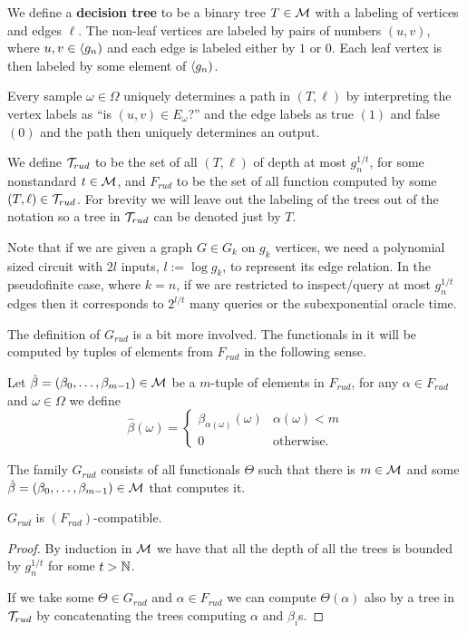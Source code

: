 \begin{defi}
We define a \textbf{decision tree} to be a binary tree $T\in\mathcal{M}$ with a labeling of vertices and edges $\ell$. The non-leaf vertices are labeled by pairs of numbers $(u,v)$, where $u,v\in\langle g_n)$ and each edge is labeled either by $1$ or $0$. Each leaf vertex is then labeled by some element of $\langle g_n)$.

Every sample $\omega\in\Omega$ uniquely determines a path in $(T,\ell)$ by interpreting the vertex labels as ``is $(u,v)\in E_\omega$?'' and the edge labels as true $(1)$ and false $(0)$ and the path then uniquely determines an output.

We define $\mathcal{T}_{rud}$ to be the set of all $(T,\ell)$ of depth at most $g_n^{1/t}$, for some nonstandard $t\in\mathcal{M}$, and $F_{rud}$ to be the set of all function computed by some $(T,\ell)\in \mathcal{T}_{rud}$. For brevity we will leave out the labeling of the trees out of the notation so a tree in $\mathcal{T}_{rud}$ can be denoted just by $T$.
\end{defi}

Note that if we are given a graph $G\in G_k$ on $g_k$ vertices, we need a polynomial sized circuit with $2l$ inputs, $l:=\log g_k$, to represent its edge relation. In the pseudofinite case, where $k=n$, if we are restricted to inspect/query at most $g_n^{1/t}$ edges then it corresponds to $2^{l/t}$ many queries or the subexponential oracle time.

The definition of $G_{rud}$ is a bit more involved. The functionals in it will be computed by tuples of elements from $F_{rud}$ in the following sense.

\begin{defi}
Let $\hat\beta=(\beta_0,\dots,\beta_{m-1})\in\mathcal{M}$ be a $m$-tuple of elements in $F_{rud}$, for any $\alpha\in F_{rud}$ and $\omega\in\Omega$ we define
\[\hat\beta(\omega)=
\begin{cases}
\beta_{\alpha(\omega)}(\omega)&\alpha(\omega)<m\\
0&\text{otherwise.}
\end{cases}\]
\end{defi}

\begin{defi}
The family $G_{rud}$ consists of all functionals $\Theta$ such that there is $m\in\mathcal{M}$ and some $\hat \beta=(\beta_0,\dots,\beta_{m-1})\in\mathcal{M}$ that computes it.
\end{defi}

\begin{lemm}
$G_{rud}$ is $(F_{rud})$-compatible.
\end{lemm}
\begin{proof}
By induction in $\mathcal{M}$ we have that all the depth of all the trees is bounded by $g_n^{1/t}$ for some $t>\mathbb{N}$.

If we take some $\Theta\in G_{rud}$ and $\alpha\in F_{rud}$ we can compute $\Theta(\alpha)$ also by a tree in $\mathcal{T}_{rud}$ by concatenating the trees computing $\alpha$ and $\beta_i$s.
\end{proof}

